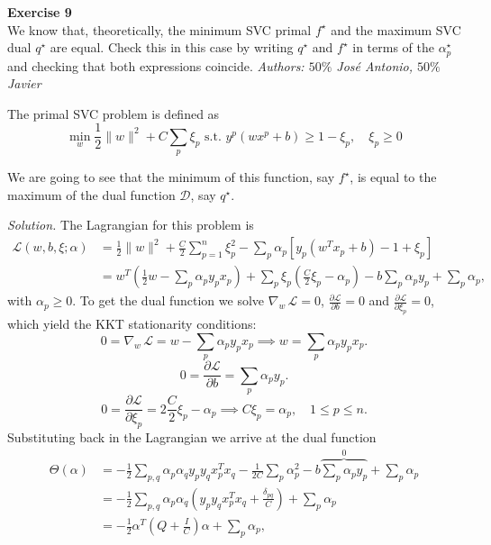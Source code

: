 \documentclass[11pt,table]{article}
\newenvironment{problem}[2][Exercise]
{ \begin{mdframed}[backgroundcolor=gray!20] \textbf{#1 #2} \\}
	{\hspace{0.0cm}\newline\newline \emph{Authors: \(50\%\) José Antonio, \(50\%\) Javier}  \end{mdframed}}
\newcommand\norm[1]{\lVert#1\rVert}
\begin{document}
	\begin{problem}{9}
		We know that, theoretically, the minimum SVC primal \(f^\star\) and the maximum SVC dual \(q^\star\) are equal. Check this in this case by writing \(q^\star\) and \(f^\star\) in terms of the \(\alpha_p^\star\) and checking that both expressions coincide.
	\end{problem}
	
	The primal SVC problem is defined as
	\[
	\min_w \frac{1}{2}\norm{w}^2 + C \sum_p \xi_p \text{ s.t. } y^p(wx^p + b) \geq 1 - \xi_p,\quad \xi_p \geq 0
	\]
	
	We are going to see that the minimum of this function, say \(f^\star\), is equal to the maximum of the dual function \(\mathcal D\), say \(q^\star\).
	
	
	\textit{Solution.} The Lagrangian for this problem is
	\begin{align*}
		\mathcal L(w, b, \xi; \alpha) & =\frac{1}{2}\|w\|^2 + \frac{C}{2}\sum_{p=1}^n \xi_p^2 - \sum_{p} \alpha_p[y_p(w^Tx_p+b)-1+\xi_p]                                                         \\
		& = w^T\left(\frac{1}{2}w - \sum_p \alpha_p y_px_p\right) + \sum_p \xi_p\left(\frac{C}{2}\xi_p - \alpha_p\right) - b\sum_p \alpha_p y_p + \sum_p \alpha_p,
	\end{align*}
	with $\alpha_p\geq 0$. To get the dual function we solve $\nabla_w\, \mathcal L = 0$, $\frac{\partial \mathcal L}{\partial b}=0$ and $\frac{\partial \mathcal L}{\partial \xi_p}=0$, which yield the KKT stationarity conditions:
	\begin{equation}
		\label{eq:kkt1}
		0=\nabla_w\, \mathcal L = w - \sum_p \alpha_p y_px_p \implies w = \sum_p \alpha_p y_px_p.
	\end{equation}
	\begin{equation}
		\label{eq:kkt2}
		0=\frac{\partial \mathcal L}{\partial b} = \sum_{p} \alpha_p y_p.
	\end{equation}
	\begin{equation}
		\label{eq:kkt3}
		0=\frac{\partial \mathcal L}{\partial \xi_p} = 2\frac{C}{2}\xi_p - \alpha_p \implies C\xi_p = \alpha_p, \quad 1\leq p \leq n.
	\end{equation}
	Substituting back in the Lagrangian we arrive at the dual function
	\begin{align*}
		\Theta(\alpha) & = -\frac{1}{2} \sum_{p, q}\alpha_p \alpha_q y_p y_q x_p^T x_q - \frac{1}{2C}\sum_p \alpha_p^2 - b \overbrace{\sum_p \alpha_py_p}^{0} + \sum_p \alpha_p \\
		& = -\frac{1}{2} \sum_{p, q}\alpha_p \alpha_q  \left(y_p y_qx_p^T x_q + \frac{\delta_{pq}}{C}\right) + \sum_p \alpha_p                                   \\
		& = -\frac{1}{2}\alpha^T\left(Q+ \frac{I}{C}\right)\alpha + \sum_p \alpha_p,
	\end{align*}
\end{document}
